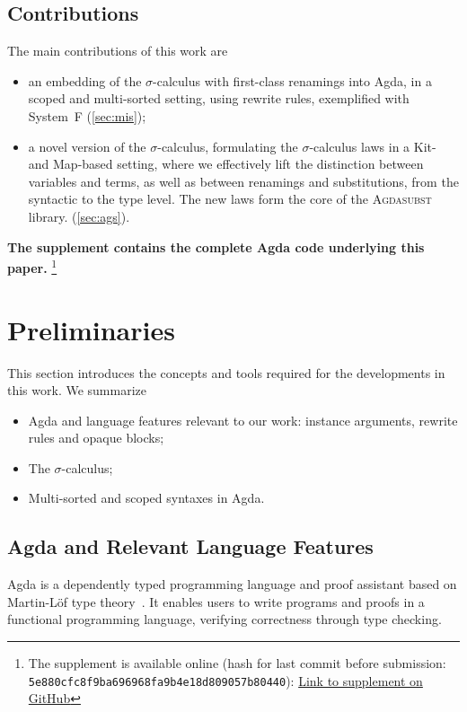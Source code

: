\documentclass[screen,nonacm]{acmart}
\begin{document}
\subsection*{Contributions}
The main contributions of this work are
\begin{itemize}
      \item an embedding of the $σ$-calculus with first-class renamings into Agda, in a
            scoped and multi-sorted setting, using rewrite rules, exemplified with System~F
            (\cref{sec:mis});
      \item a novel version of the $σ$-calculus, formulating the $σ$-calculus laws in a
            Kit- and Map-based setting, where we effectively lift the distinction between
            variables and terms, as well as between renamings and substitutions, from the
            syntactic to the type level. The new laws form the core of the
            \textsc{Agdasubst} library. (\cref{sec:ags}).
\end{itemize}

\noindent\textbf{The supplement contains the complete Agda code underlying this paper.}
\footnote{The supplement is available online (hash for last commit before submission: \texttt{5e880cfc8f9ba696968fa9b4e18d809057b80440}): \href{https://github.com/Mari-W/Agdasubst}{Link to supplement on GitHub}}

\section{Preliminaries}\label{sec:pre}
This section introduces the concepts and tools required for the developments in
this work. We summarize
\begin{itemize}
      \item Agda and language features relevant to our work: instance arguments, rewrite
            rules and opaque blocks;
      \item The $σ$-calculus;
      \item Multi-sorted and scoped syntaxes in Agda.
\end{itemize}

\subsection{Agda and Relevant Language Features}\label{sec:pre-agd}
Agda is a dependently typed programming language and proof assistant based on
Martin-Löf type theory~\cite{MARTINLOF197573}. It enables users to write
programs and proofs in a functional programming language, verifying correctness
through type checking.
\end{document}
